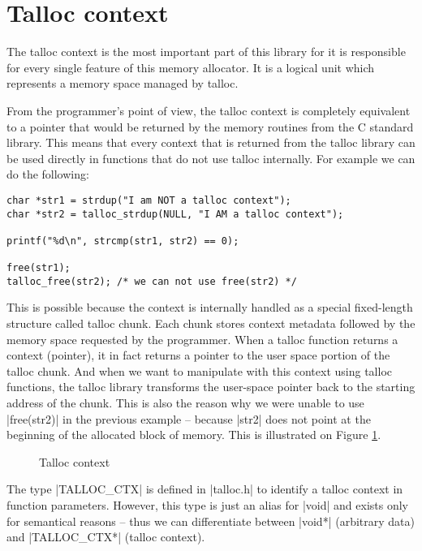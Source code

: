 \section{Talloc context}
\label{talloc:sec:context}

The talloc context is the most important part of this library for it is
responsible for every single feature of this memory allocator. It is a logical
unit which represents a memory space managed by talloc.

From the programmer's point of view, the talloc context is completely
equivalent to a pointer that would be returned by the memory routines from the
C standard library. This means that every context that is returned from the
talloc library can be used directly in functions that do not use talloc
internally. For example we can do the following:

\begin{lstlisting}
char *str1 = strdup("I am NOT a talloc context");
char *str2 = talloc_strdup(NULL, "I AM a talloc context");

printf("%d\n", strcmp(str1, str2) == 0);

free(str1);
talloc_free(str2); /* we can not use free(str2) */
\end{lstlisting}

This is possible because the context is internally handled as a special
fixed-length structure called talloc chunk. Each chunk stores context metadata
followed by the memory space requested by the programmer. When a talloc
function returns a context (pointer), it in fact returns a pointer to the user
space portion of the talloc chunk. And when we want to manipulate with this
context using talloc functions, the talloc library transforms the user-space
pointer back to the starting address of the chunk. This is also the reason why
we were unable to use |free(str2)| in the previous example -- because |str2|
does not point at the beginning of the allocated block of memory. This is
illustrated on Figure \ref{fig:talloc-context}.

\begin{figure}[H]
  \centering
  
  \caption{Talloc context}
  \label{fig:talloc-context}
\end{figure}

\noindent
The type |TALLOC_CTX| is defined in |talloc.h| to identify a talloc context in
function parameters. However, this type is just an alias for |void| and exists
only for semantical reasons -- thus we can differentiate between |void*|
(arbitrary data) and |TALLOC_CTX*| (talloc context).

